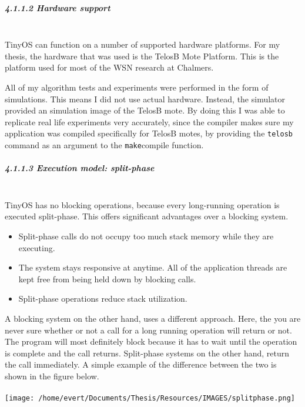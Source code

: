 \subparagraph{4.1.1.2 Hardware support\\\\}\label{hardware-support}

TinyOS can function on a number of supported hardware platforms. For my
thesis, the hardware that was used is the TelosB Mote
Platform\cite{datasheet2013crossbow}. This is the platform used for most
of the WSN research at Chalmers.

All of my algorithm tests and experiments were performed in the form of
simulations. This means I did not use actual hardware. Instead, the
simulator provided an simulation image of the TelosB mote. By doing this
I was able to replicate real life experiments very accurately, since the
compiler makes sure my application was compiled specifically for TelosB
motes, by providing the \texttt{telosb} command as an argument to the
\texttt{make}compile function.

\subparagraph{4.1.1.3 Execution model:
split-phase\\\\}\label{execution-model-split-phase}

TinyOS has no blocking operations, because every long-running operation
is executed split-phase. This offers significant advantages over a
blocking system\cite{levis2009tinyos}.

\begin{itemize}
\itemsep1pt\parskip0pt
\item
  Split-phase calls do not occupy too much stack memory while they are
  executing.
\item
  The system stays responsive at anytime. All of the application threads
  are kept free from being held down by blocking calls.
\item
  Split-phase operations reduce stack utilization.
\end{itemize}

A blocking system on the other hand, uses a different approach. Here,
the you are never sure whether or not a call for a long running
operation will return or not. The program will most definitely block
because it has to wait until the operation is complete and the call
returns. Split-phase systems on the other hand, return the call
immediately. A simple example of the difference between the two is shown
in the figure below.\\\\
\texttt{[image: /home/evert/Documents/Thesis/Resources/IMAGES/splitphase.png]}

